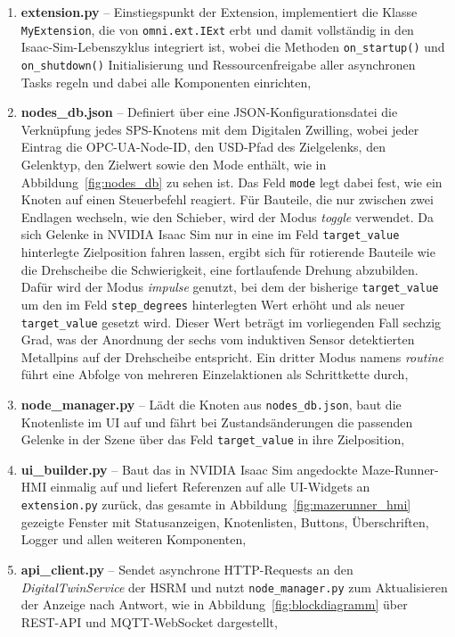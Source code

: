\begin{enumerate}
    \item \textbf{extension.py} -- Einstiegspunkt der Extension, implementiert die Klasse \texttt{MyExtension}, die von \texttt{omni.ext.IExt} erbt und damit vollständig in den Isaac-Sim-Lebenszyklus integriert ist, wobei die Methoden \texttt{on\_startup()} und \texttt{on\_shutdown()} Initialisierung und Ressourcenfreigabe aller asynchronen Tasks regeln und dabei alle Komponenten einrichten,
    \item \textbf{nodes\_db.json} -- Definiert über eine JSON-Konfigurationsdatei die Verknüpfung jedes SPS-Knotens mit dem Digitalen Zwilling, wobei jeder Eintrag die OPC-UA-Node-ID, den USD-Pfad des Zielgelenks, den Gelenktyp, den Zielwert sowie den Mode enthält, wie in Abbildung~\ref{fig:nodes_db} zu sehen ist.
    Das Feld \texttt{mode} legt dabei fest, wie ein Knoten auf einen Steuerbefehl reagiert.
    Für Bauteile, die nur zwischen zwei Endlagen wechseln, wie den Schieber, wird der Modus \emph{toggle} verwendet.
    Da sich Gelenke in NVIDIA Isaac Sim nur in eine im Feld \texttt{target\_value} hinterlegte Zielposition fahren lassen, ergibt sich für rotierende Bauteile wie die Drehscheibe die Schwierigkeit, eine fortlaufende Drehung abzubilden.
    Dafür wird der Modus \emph{impulse} genutzt, bei dem der bisherige \texttt{target\_value} um den im Feld \texttt{step\_degrees} hinterlegten Wert erhöht und als neuer \texttt{target\_value} gesetzt wird.
    Dieser Wert beträgt im vorliegenden Fall sechzig Grad, was der Anordnung der sechs vom induktiven Sensor detektierten Metallpins auf der Drehscheibe entspricht.
    Ein dritter Modus namens \emph{routine} führt eine Abfolge von mehreren Einzelaktionen als Schrittkette durch,
    \item \textbf{node\_manager.py} -- Lädt die Knoten aus \texttt{nodes\_db.json}, baut die Knotenliste im UI auf und fährt bei Zustandsänderungen die passenden Gelenke in der Szene über das Feld \texttt{target\_value} in ihre Zielposition,
    \item \textbf{ui\_builder.py} -- Baut das in NVIDIA Isaac Sim angedockte Maze-Runner-HMI einmalig auf und liefert Referenzen auf alle UI-Widgets an \texttt{extension.py} zurück, das gesamte in Abbildung~\ref{fig:mazerunner_hmi} gezeigte Fenster mit Statusanzeigen, Knotenlisten, Buttons, Überschriften, Logger und allen weiteren Komponenten,
    \item \textbf{api\_client.py} -- Sendet asynchrone HTTP-Requests an den \emph{DigitalTwinService} der HSRM und nutzt \texttt{node\_manager.py} zum Aktualisieren der Anzeige nach Antwort, wie in Abbildung~\ref{fig:blockdiagramm} über REST-API und MQTT-WebSocket dargestellt,

\end{enumerate}
